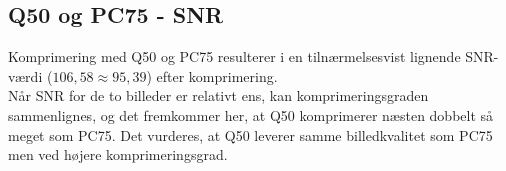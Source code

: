 %

\subsection*{Q50 og PC75 - SNR}
Komprimering med Q50 og PC75 resulterer i en tilnærmelsesvist lignende SNR-værdi ($106,58 \approx 95,39$) efter komprimering.\\
Når SNR for de to billeder er relativt ens, kan komprimeringsgraden sammenlignes, og det fremkommer her, at Q50 komprimerer næsten dobbelt så meget som PC75. Det vurderes, at Q50 leverer samme billedkvalitet som PC75 men ved højere komprimeringsgrad.

